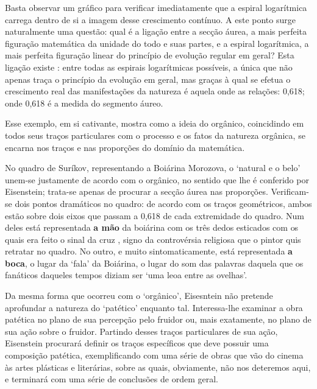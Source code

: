 Basta observar um gráfico para verificar imediatamente que a espiral
logarítmica carrega dentro de si a imagem desse crescimento contínuo. A
este ponto surge naturalmente uma questão: qual é a ligação entre a
secção áurea, a mais perfeita figuração matemática da unidade do todo e
suas partes, e a espiral logarítmica, a mais perfeita figuração linear
do princípio de evolução regular em geral? Esta ligação existe : entre
todas as espirais logarítmicas possíveis, a única que não apenas traça o
princípio da evolução em geral, mas graças à qual se efetua o
crescimento real das manifestações da natureza é aquela onde as
relações:
0,618; onde 0,618 é a medida do segmento áureo.

Esse exemplo, em si cativante, mostra como a ideia do orgânico,
coincidindo em todos seus traços particulares com o processo e os fatos
da natureza orgânica, se encarna nos traços e nas proporções do domínio
da matemática.

No quadro de Suríkov, representando a Boiárina Morozova, o `natural e o
belo' unem-se justamente de acordo com o orgânico, no sentido que lhe é
conferido por Eisenstein; trata-se apenas de procurar a secção áurea nas
proporções. Verificam-se dois pontos dramáticos no quadro: de acordo com
os traços geométricos, ambos estão sobre dois eixos que passam a 0,618
de cada extremidade do quadro. Num deles está representada \textbf{a
mão} da boiárina com os três dedos esticados com os quais era feito o
sinal da cruz , signo da controvérsia religiosa que o pintor quis
retratar no quadro. No outro, e muito sintomaticamente, está
representada \textbf{a boca}, o lugar da `fala' da Boiárina, o lugar do
som das palavras daquela que os fanáticos daqueles tempos diziam ser
`uma leoa entre as ovelhas'.


Da mesma forma que ocorreu com o `orgânico', Eisesntein não pretende
aprofundar a natureza do `patético' enquanto tal. Interessa-lhe examinar
a obra patética no plano de sua percepção pelo fruidor ou, mais
exatamente, no plano de sua ação sobre o fruidor. Partindo desses traços
particulares de sua ação, Eisenstein procurará definir os traços
específicos que deve possuir uma composição patética, exemplificando com
uma série de obras que vão do cinema às artes plásticas e literárias,
sobre as quais, obviamente, não nos deteremos aqui, e terminará com uma
série de conclusões de ordem geral.

